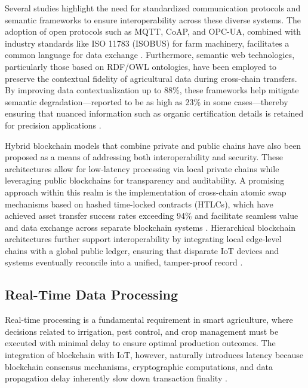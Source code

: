 \documentclass[12pt,onecolumn]{IEEEtran} %
\begin{document}
Several studies highlight the need for standardized communication protocols and semantic frameworks to ensure interoperability across these diverse systems. The adoption of open protocols such as MQTT, CoAP, and OPC-UA, combined with industry standards like ISO 11783 (ISOBUS) for farm machinery, facilitates a common language for data exchange \cite{irfan2025aniotdrivensmart, abdurrohim2024blockchainbasedframeworkfor}. Furthermore, semantic web technologies, particularly those based on RDF/OWL ontologies, have been employed to preserve the contextual fidelity of agricultural data during cross-chain transfers. By improving data contextualization up to 88\%, these frameworks help mitigate semantic degradation---reported to be as high as 23\% in some cases---thereby ensuring that nuanced information such as organic certification details is retained for precision applications \cite{irfan2025aniotdrivensmart, huang2025digitaltraceabilityin}.

Hybrid blockchain models that combine private and public chains have also been proposed as a means of addressing both interoperability and security. These architectures allow for low-latency processing via local private chains while leveraging public blockchains for transparency and auditability. A promising approach within this realm is the implementation of cross-chain atomic swap mechanisms based on hashed time-locked contracts (HTLCs), which have achieved asset transfer success rates exceeding 94\% and facilitate seamless value and data exchange across separate blockchain systems \cite{abdurrohim2024blockchainbasedframeworkfor, huang2025digitaltraceabilityin}. Hierarchical blockchain architectures further support interoperability by integrating local edge-level chains with a global public ledger, ensuring that disparate IoT devices and systems eventually reconcile into a unified, tamper-proof record \cite{thiruvenkatasamy2025anonlinetool, irfan2025aniotdrivensmart}.
  \subsection{Real-Time Data Processing}\label{subsec:realtime}
Real-time processing is a fundamental requirement in smart agriculture, where decisions related to irrigation, pest control, and crop management must be executed with minimal delay to ensure optimal production outcomes. The integration of blockchain with IoT, however, naturally introduces latency because blockchain consensus mechanisms, cryptographic computations, and data propagation delay inherently slow down transaction finality \cite{huang2025digitaltraceabilityin, huang2025digitaltraceabilityin}.
\end{document}
